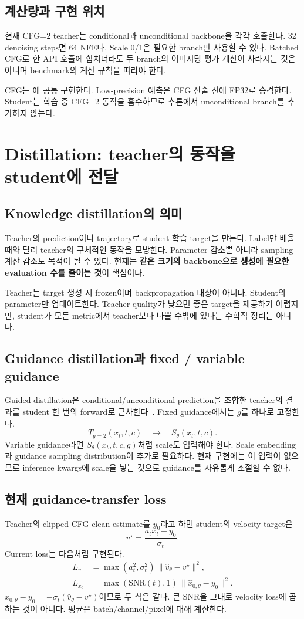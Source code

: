 \documentclass[11pt,a4paper]{article}
\newcommand{\code}[1]{\texttt{\detokenize{#1}}}
\begin{document}
\subsection{계산량과 구현 위치}
현재 CFG=2 teacher는 conditional과 unconditional backbone을 각각 호출한다. 32 denoising steps면 64 NFE다. Scale 0/1은 필요한 branch만 사용할 수 있다. Batched CFG로 한 API 호출에 합치더라도 두 branch의 이미지당 평가 계산이 사라지는 것은 아니며 benchmark의 계산 규칙을 따라야 한다.

CFG는 \code{teacher/cfg.py}에 공통 구현한다. Low-precision 예측은 CFG 산술 전에 FP32로 승격한다. Student는 학습 중 CFG=2 동작을 흡수하므로 추론에서 unconditional branch를 추가하지 않는다.

\section{Distillation: teacher의 동작을 student에 전달}
\subsection{Knowledge distillation의 의미}
Teacher의 prediction이나 trajectory로 student 학습 target을 만든다. Label만 배울 때와 달리 teacher의 구체적인 동작을 모방한다. Parameter 감소뿐 아니라 sampling 계산 감소도 목적이 될 수 있다. 현재는 \textbf{같은 크기의 backbone으로 생성에 필요한 evaluation 수를 줄이는 것}이 핵심이다.

Teacher는 target 생성 시 frozen이며 backpropagation 대상이 아니다. Student의 parameter만 업데이트한다. Teacher quality가 낮으면 좋은 target을 제공하기 어렵지만, student가 모든 metric에서 teacher보다 나쁠 수밖에 있다는 수학적 정리는 아니다.

\subsection{Guidance distillation과 fixed / variable guidance}
Guided distillation은 conditional/unconditional prediction을 조합한 teacher의 결과를 student 한 번의 forward로 근사한다~\cite{guided}. Fixed guidance에서는 $g$를 하나로 고정한다.
\[
T_{g=2}(x_t,t,c)\quad\longrightarrow\quad S_\theta(x_t,t,c).
\]
Variable guidance라면 $S_\theta(x_t,t,c,g)$처럼 scale도 입력해야 한다. Scale embedding과 guidance sampling distribution이 추가로 필요하다. 현재 구현에는 이 입력이 없으므로 inference kwargs에 scale을 넣는 것으로 guidance를 자유롭게 조절할 수 없다.

\subsection{현재 guidance-transfer loss}
Teacher의 clipped CFG clean estimate를 $y_0$라고 하면 student의 velocity target은
\[
v^\star=\frac{a_t x_t-y_0}{\sigma_t}.
\]
Current loss는 다음처럼 구현된다.
\begin{align}
L_v&=\max(a_t^2,\sigma_t^2)\,\|\hat v_\theta-v^\star\|^2,\\
L_{x_0}&=\max(\mathrm{SNR}(t),1)\,\|\hat x_{0,\theta}-y_0\|^2.
\end{align}
$\hat x_{0,\theta}-y_0=-\sigma_t(\hat v_\theta-v^\star)$이므로 두 식은 같다. 큰 SNR을 그대로 velocity loss에 곱하는 것이 아니다. 평균은 batch/channel/pixel에 대해 계산한다.
\end{document}
